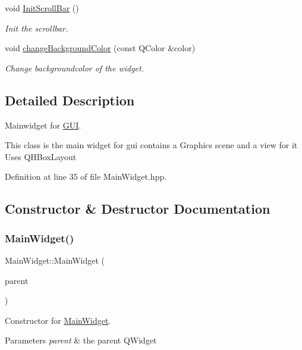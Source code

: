 \begin{DoxyCompactItemize}
void \mbox{\hyperlink{classMainWidget_af544f3b04a81d63c0810a90706773d3d}{Init\+Scroll\+Bar}} ()
\begin{DoxyCompactList}\small\item\em Init the scrollbar. \end{DoxyCompactList}\item 
void \mbox{\hyperlink{classMainWidget_a72ea27c7a7054d789e7ab688cf8b0c38}{change\+Background\+Color}} (const Q\+Color \&color)
\begin{DoxyCompactList}\small\item\em Change backgroundcolor of the widget. \end{DoxyCompactList}\end{DoxyCompactItemize}


\subsection{Detailed Description}
Mainwidget for \mbox{\hyperlink{classGUI}{G\+UI}}. 

This class is the main widget for gui contains a Graphics scene and a view for it Uses Q\+H\+Box\+Layout 

Definition at line 35 of file Main\+Widget.\+hpp.



\subsection{Constructor \& Destructor Documentation}
\mbox{\label{classMainWidget_a62f5aa5fe2314c6221ac49b328b72e8b}} 
\subsubsection{\texorpdfstring{Main\+Widget()}{MainWidget()}}
{\footnotesize\ttfamily Main\+Widget\+::\+Main\+Widget (\begin{DoxyParamCaption}\item[{Q\+Widget $\ast$}]{parent }\end{DoxyParamCaption})}



Constructor for \mbox{\hyperlink{classMainWidget}{Main\+Widget}}. 


\begin{DoxyParams}{Parameters}
{\em parent} & the parent Q\+Widget \\
\hline
\end{DoxyParams}


